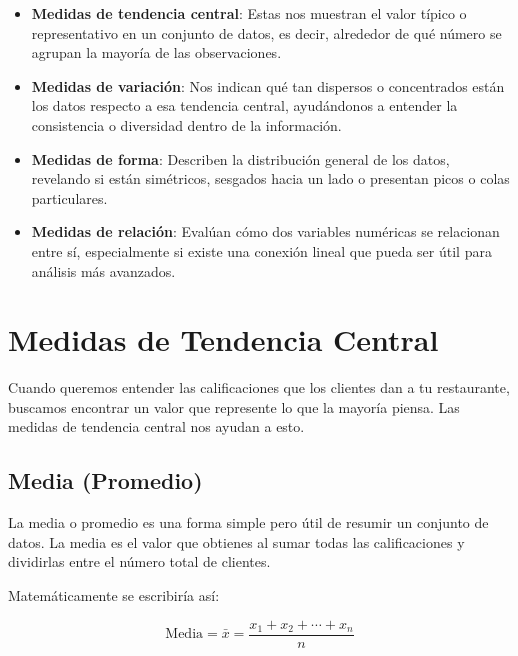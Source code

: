 \documentclass[
  spanish,
  letterpaper,
  DIV=11,
  numbers=noendperiod]{scrreprt}
\providecommand{\tightlist}{%
  \setlength{\itemsep}{0pt}\setlength{\parskip}{0pt}}
\begin{document}
\begin{itemize}
\tightlist
\item
  \textbf{Medidas de tendencia central}: Estas nos muestran el valor
  típico o representativo en un conjunto de datos, es decir, alrededor
  de qué número se agrupan la mayoría de las observaciones.
\item
  \textbf{Medidas de variación}: Nos indican qué tan dispersos o
  concentrados están los datos respecto a esa tendencia central,
  ayudándonos a entender la consistencia o diversidad dentro de la
  información.
\item
  \textbf{Medidas de forma}: Describen la distribución general de los
  datos, revelando si están simétricos, sesgados hacia un lado o
  presentan picos o colas particulares.
\item
  \textbf{Medidas de relación}: Evalúan cómo dos variables numéricas se
  relacionan entre sí, especialmente si existe una conexión lineal que
  pueda ser útil para análisis más avanzados.
\end{itemize}

\section{Medidas de Tendencia
Central}\label{medidas-de-tendencia-central}

Cuando queremos entender las calificaciones que los clientes dan a tu
restaurante, buscamos encontrar un valor que represente lo que la
mayoría piensa. Las medidas de tendencia central nos ayudan a esto.

\subsection{Media (Promedio)}\label{media-promedio}

La media o promedio es una forma simple pero útil de resumir un conjunto
de datos. La media es el valor que obtienes al sumar todas las
calificaciones y dividirlas entre el número total de clientes.

\begin{tcolorbox}[enhanced jigsaw, bottomrule=.15mm, colframe=quarto-callout-tip-color-frame, breakable, colback=white, leftrule=.75mm, left=2mm, arc=.35mm, toprule=.15mm, opacityback=0, rightrule=.15mm]
\begin{minipage}[t]{5.5mm}
\textcolor{quarto-callout-tip-color}{\faLightbulb}
\end{minipage}%
\begin{minipage}[t]{\textwidth - 5.5mm}

Matemáticamente se escribiría así:

\[
\text{Media} = \bar{x} = \frac{x_1 + x_2 + \cdots + x_n}{n}
\]

\end{minipage}%
\end{tcolorbox}
\end{document}
